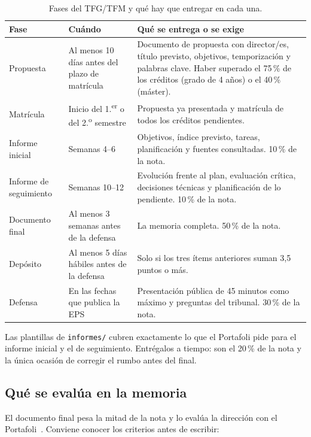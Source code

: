 \documentclass[11pt,a4paper]{article}
\begin{document}
\begin{table}[htbp]
  \centering
  \caption{Fases del TFG/TFM y qué hay que entregar en cada una.}
  \label{tab:fases}
  \small
  \begin{tabularx}{\textwidth}{@{}p{3.1cm}p{3.6cm}L@{}}
    \toprule
    \textbf{Fase} & \textbf{Cuándo} & \textbf{Qué se entrega o se exige} \\
    \midrule
    Propuesta & Al menos 10 días antes del plazo de matrícula & Documento de propuesta con director/es, título previsto, objetivos, temporización y palabras clave. Haber superado el 75\,\% de los créditos (grado de 4 años) o el 40\,\% (máster). \\
    Matrícula & Inicio del 1.\textsuperscript{er} o del 2.\textsuperscript{o} semestre & Propuesta ya presentada y matrícula de todos los créditos pendientes. \\
    Informe inicial & Semanas 4--6 & Objetivos, índice previsto, tareas, planificación y fuentes consultadas. 10\,\% de la nota. \\
    Informe de seguimiento & Semanas 10--12 & Evolución frente al plan, evaluación crítica, decisiones técnicas y planificación de lo pendiente. 10\,\% de la nota. \\
    Documento final & Al menos 3 semanas antes de la defensa & La memoria completa. 50\,\% de la nota. \\
    Depósito & Al menos 5 días hábiles antes de la defensa & Solo si los tres ítems anteriores suman 3,5 puntos o más. \\
    Defensa & En las fechas que publica la EPS & Presentación pública de 45 minutos como máximo y preguntas del tribunal. 30\,\% de la nota. \\
    \bottomrule
  \end{tabularx}
\end{table}

Las plantillas de \texttt{informes/} cubren exactamente lo que el Portafoli
pide para el informe inicial y el de seguimiento. Entrégalos a tiempo: son el
20\,\% de la nota y la única ocasión de corregir el rumbo antes del final.

\subsection{Qué se evalúa en la memoria}

El documento final pesa la mitad de la nota y lo evalúa la dirección con el
Portafoli~\cite{eps_portafoli2025}. Conviene conocer los criterios antes de
escribir:
\end{document}
